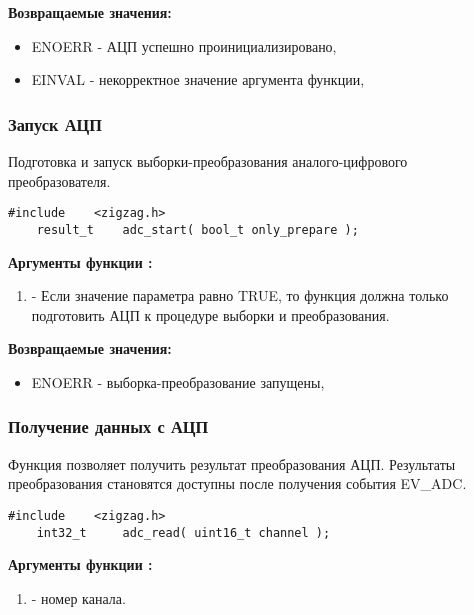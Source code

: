 {\bfseries Возвращаемые значения:}

{\itshape
\begin{itemize}
\item ENOERR - АЦП успешно проинициализировано,
\item EINVAL - некорректное значение аргумента функции,
\end{itemize}
}

\subsubsection{Запуск АЦП}
Подготовка и запуск выборки-преобразования аналого-цифрового преобразователя. 
\begin{lstlisting}[caption=\myarg{adc\_start()} - запуск АЦП, label=adcstartfunc ]
    #include    <zigzag.h>
    result_t    adc_start( bool_t only_prepare );
\end{lstlisting}

{\bfseries Аргументы функции :}
{\itshape
\begin{enumerate}
\item {} - Если значение параметра равно TRUE, то функция
    должна только подготовить АЦП к процедуре выборки и преобразования.
\end{enumerate}
}

{\bfseries Возвращаемые значения:}

{\itshape
\begin{itemize}
\item ENOERR - выборка-преобразование запущены,
\end{itemize}
}

\subsubsection{Получение данных с АЦП}
Функция позволяет получить результат преобразования АЦП. Результаты преобразования
становятся доступны после получения события EV\_ADC.

\begin{lstlisting}[caption=\myarg{adc\_read()} - вычитывание с АЦП, label=adcreadfunc ]
    #include    <zigzag.h>
    int32_t     adc_read( uint16_t channel );
\end{lstlisting}

{\bfseries Аргументы функции :}
{\itshape
\begin{enumerate}
\item {} - номер канала.
\end{enumerate}
}

